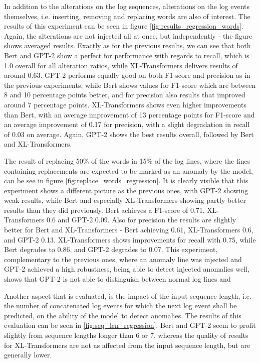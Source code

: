 In addition to the alterations on the log sequences, alterations on the log events themselves, i.e. inserting, removing and replacing words are also of interest. The results of this experiment can be seen in figure \ref{fig:results_regression_words}. Again, the alterations are not injected all at once, but independently - the figure shows averaged results. Exactly as for the previous results, we can see that both Bert and GPT-2 show a perfect for performance with regards to recall, which is 1.0 overall for all alteration ratios, while XL-Transformers delivers results of around 0.63. GPT-2 performs equally good on both F1-score and precision as in the previous experiments, while Bert shows values for F1-score which are between 8 and 10 percentage points better, and for precision also results that improved around 7 percentage points. XL-Transformers shows even higher improvements than Bert, with an average improvement of 13 percentage points for F1-score and an average improvement of 0.17 for precision, with a slight degradation in recall of 0.03 on average. Again, GPT-2 shows the best results overall, followed by Bert and XL-Transformers.

The result of replacing 50\% of the words in 15\% of the log lines, where the lines containing replacements are expected to be marked as an anomaly by the model, can be see in figure \ref{fig:replace_words_regression}. It is clearly visible that this experiment shows a different picture as the previous ones, with GPT-2 showing weak results, while Bert and especially XL-Transformers showing partly better results than they did previously. Bert achieves a F1-score of 0.71, XL-Transformers 0.6 and GPT-2 0.09. Also for precision the results are slightly better for Bert and XL-Transformers - Bert achieving 0.61, XL-Transformers 0.6, and GPT-2 0.13. XL-Transformers shows improvements for recall with 0.75, while Bert degrades to 0.86, and GPT-2 degrades to 0.07. This experiment, complementary to the previous ones, where an anomaly line was injected and GPT-2 achieved a high robustness, being able to detect injected anomalies well, shows that GPT-2 is not able to distinguish between normal log lines and 

Another aspect that is evaluated, is the impact of the input sequence length, i.e. the number of concatenated log events for which the next log event shall be predicted, on the ability of the model to detect anomalies. The results of this evaluation can be seen in \ref{fig:seq_len_regression}. Bert and GPT-2 seem to profit slightly from sequence lengths longer than 6 or 7, whereas the quality of results for XL-Transformers are not as affected from the input sequence length, but are generally lower.

